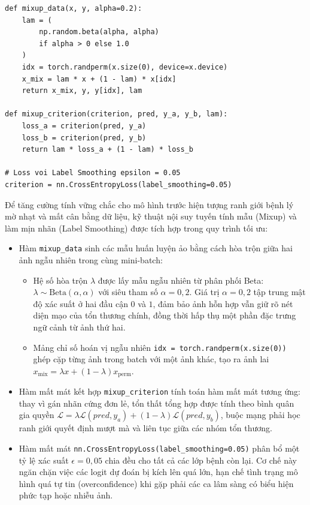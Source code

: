 \begin{lstlisting}[caption={Cài đặt kỹ thuật Mixup và Label Smoothing}]
def mixup_data(x, y, alpha=0.2):
    lam = (
        np.random.beta(alpha, alpha)
        if alpha > 0 else 1.0
    )
    idx = torch.randperm(x.size(0), device=x.device)
    x_mix = lam * x + (1 - lam) * x[idx]
    return x_mix, y, y[idx], lam

def mixup_criterion(criterion, pred, y_a, y_b, lam):
    loss_a = criterion(pred, y_a)
    loss_b = criterion(pred, y_b)
    return lam * loss_a + (1 - lam) * loss_b

# Loss voi Label Smoothing epsilon = 0.05
criterion = nn.CrossEntropyLoss(label_smoothing=0.05)
\end{lstlisting}
Để tăng cường tính vững chắc cho mô hình trước hiện tượng ranh giới bệnh lý mờ nhạt và mất cân bằng dữ liệu, kỹ thuật nội suy tuyến tính mẫu (Mixup) và làm mịn nhãn (Label Smoothing) được tích hợp trong quy trình tối ưu:
\begin{itemize}
  \item Hàm \texttt{mixup\_data} sinh các mẫu huấn luyện ảo bằng cách hòa trộn giữa hai ảnh ngẫu nhiên trong cùng mini-batch:
  \begin{itemize}
    \item Hệ số hòa trộn $\lambda$ được lấy mẫu ngẫu nhiên từ phân phối Beta: $\lambda \sim \mathrm{Beta}(\alpha, \alpha)$ với siêu tham số $\alpha = 0{,}2$. Giá trị $\alpha = 0{,}2$ tập trung mật độ xác suất ở hai đầu cận $0$ và $1$, đảm bảo ảnh hỗn hợp vẫn giữ rõ nét diện mạo của tổn thương chính, đồng thời hấp thụ một phần đặc trưng ngữ cảnh từ ảnh thứ hai.
    \item Mảng chỉ số hoán vị ngẫu nhiên \texttt{idx = torch.randperm(x.size(0))} ghép cặp từng ảnh trong batch với một ảnh khác, tạo ra ảnh lai $x_{\mathrm{mix}} = \lambda x + (1-\lambda) x_{\mathrm{perm}}$.
  \end{itemize}
  \item Hàm mất mát kết hợp \texttt{mixup\_criterion} tính toán hàm mất mát tương ứng: thay vì gán nhãn cứng đơn lẻ, tổn thất tổng hợp được tính theo bình quân gia quyền $\mathcal{L} = \lambda \mathcal{L}(pred, y_a) + (1-\lambda) \mathcal{L}(pred, y_b)$, buộc mạng phải học ranh giới quyết định mượt mà và liên tục giữa các nhóm tổn thương.
  \item Hàm mất mát \texttt{nn.CrossEntropyLoss(label\_smoothing=0.05)} phân bổ một tỷ lệ xác suất $\epsilon = 0{,}05$ chia đều cho tất cả các lớp bệnh còn lại. Cơ chế này ngăn chặn việc các logit dự đoán bị kích lên quá lớn, hạn chế tình trạng mô hình quá tự tin (overconfidence) khi gặp phải các ca lâm sàng có biểu hiện phức tạp hoặc nhiễu ảnh.
\end{itemize}


